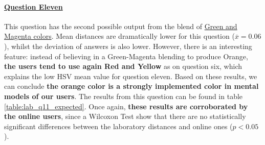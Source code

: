 \paragraph{\ul{Question Eleven}}
%
This question has the second possible output from the blend of \ul{Green and Magenta colors}. Mean distances are dramatically lower for this question ($\overline{x} = 0.06$),
whilst the deviation of answers is also lower. However, there is an interesting feature: instead of believing in a Green-Magenta blending to produce Orange, \textbf{the users tend to use again Red and Yellow} as on question six,
which explains the low HSV mean value for question eleven.
%
Based on these results, we can conclude \textbf{the orange color is a strongly implemented color in mental models of our users}. The results from this question can be found in table
\ref{table:lab_q11_expected}. Once again, \textbf{these results are corroborated by the online users}, since a Wilcoxon Test show that there are no statistically significant differences between the laboratory
distances and online ones ($p < 0.05$).
%
